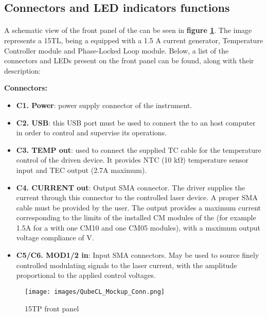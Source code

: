 
\subsection{Connectors and LED indicators functions}    \label{cpt:led_and_connectors}

\paragraph{}A schematic view of the front panel of the \QubeModel  can be seen in \textbf{figure \ref{fig:Qube_front_panel}}. The image represents a \QubeModel 15TL, being a \QubeModel  equipped with a 1.5 A current generator, Temperature Controller module and Phase-Locked Loop module. Below, a list of the connectors and LEDs present on the front panel can be found, along with their description:

\textbf{Connectors:}
\begin{itemize}
    \item \textbf{C1. Power}: power supply connector of the instrument.
    \item \textbf{C2. USB}: this USB port must be used to connect the \QubeModel  to an host computer in order to control and supervise its operations.
    \item \textbf{C3. TEMP out}: used to connect the supplied TC cable for the temperature control of the driven device. It provides NTC (10 kΩ) temperature sensor input and TEC output (2.7A maximum).
    \item \textbf{C4. CURRENT out}: Output SMA connector. The driver supplies the current through this connector to the controlled laser device. A proper SMA cable must be provided by the user. The output provides a maximum current corresponding to the limits of the installed CM modules of the \QubeModel  (for example 1.5A for a \QubeModel  with one CM10 and one CM05 modules), with a maximum output voltage compliance of \QubeCompliance V.
    \item \textbf{C5/C6. MOD1/2 in}: Input SMA connectors. May be used to source finely controlled modulating signals to the laser current, with the amplitude proportional to the applied control voltages.
\end{itemize}


\begin{figure}[h]
    \begin{centering}
        \texttt{[image: images/QubeCL\_Mockup\_Conn.png]}
        \caption{\QubeModel 15TP front panel}
        \label{fig:Qube_front_panel}
    \end{centering}
\end{figure}


